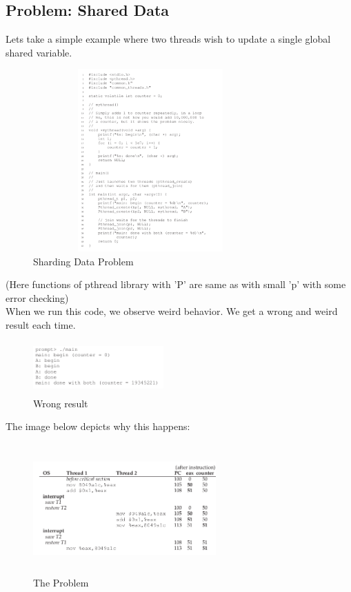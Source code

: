\subsection{Problem: Shared Data}

Lets take a simple example where two threads wish to update a single global
shared variable.

\begin{figure}[h!]
    \begin{center}
        \includegraphics[width=9cm, height=7cm]{img/266.png}
        \caption{Sharding Data Problem}
    \end{center}
\end{figure}

(Here functions of pthread library with 'P' are same as with small 'p' with
some error checking)\\

When we run this code, we observe weird behavior. We get a wrong and weird
result each time.

\begin{figure}[h!]
    \begin{center}
        \includegraphics[width=5cm, height=2cm]{img/counterex.png}
        \caption{Wrong result}
    \end{center}
\end{figure}

The image below depicts why this happens:

\begin{figure}[h!]
    \begin{center}
        \includegraphics[width=7cm, height=5cm]{img/267.png}
        \caption{The Problem}
    \end{center}
\end{figure}

